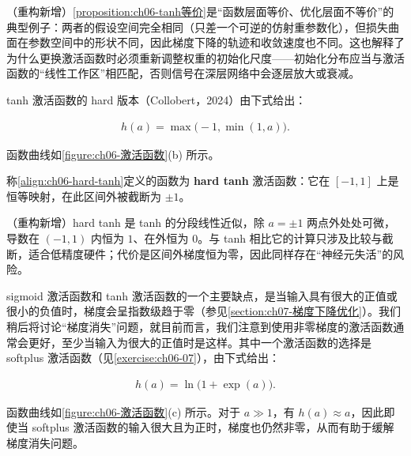 \documentclass[../../main.tex]{subfiles}
\begin{document}
\begin{remark}（重构新增）\cref{proposition:ch06-tanh等价}是“函数层面等价、优化层面不等价”的典型例子：两者的假设空间完全相同（只差一个可逆的仿射重参数化），但损失曲面在参数空间中的形状不同，因此梯度下降的轨迹和收敛速度也不同。这也解释了为什么更换激活函数时必须重新调整权重的初始化尺度——初始化分布应当与激活函数的“线性工作区”相匹配，否则信号在深层网络中会逐层放大或衰减。
\end{remark}

tanh 激活函数的 hard 版本（Collobert，2024）由下式给出：

\begin{align}
h(a)=\max\bigl(-1,\min(1,a)\bigr).
\label{align:ch06-hard-tanh}
\end{align}

函数曲线如\cref{figure:ch06-激活函数}(b) 所示。

\begin{definition}\label{definition:ch06-hard-tanh}
称\eqref{align:ch06-hard-tanh}定义的函数为 \textbf{hard tanh} 激活函数：它在 $[-1,1]$ 上是恒等映射，在此区间外被截断为 $\pm1$。
\end{definition}

\begin{remark}（重构新增）hard tanh 是 tanh 的分段线性近似，除 $a=\pm1$ 两点外处处可微，导数在 $(-1,1)$ 内恒为 $1$、在外恒为 $0$。与 tanh 相比它的计算只涉及比较与截断，适合低精度硬件；代价是区间外梯度恒为零，因此同样存在“神经元失活”的风险。
\end{remark}

sigmoid 激活函数和 tanh 激活函数的一个主要缺点，是当输入具有很大的正值或很小的负值时，梯度会呈指数级趋于零（参见\cref{section:ch07-梯度下降优化}）。我们稍后将讨论“梯度消失”问题，就目前而言，我们注意到使用非零梯度的激活函数通常会更好，至少当输入为很大的正值时是这样。其中一个激活函数的选择是 softplus 激活函数（见\cref{exercise:ch06-07}），由下式给出：

\begin{align}
h(a)=\ln\bigl(1+\exp(a)\bigr).
\label{align:ch06-softplus}
\end{align}

函数曲线如\cref{figure:ch06-激活函数}(c) 所示。对于 $a\gg1$，有 $h(a)\approx a$，因此即使当 softplus 激活函数的输入很大且为正时，梯度也仍然非零，从而有助于缓解梯度消失问题。
\end{document}
